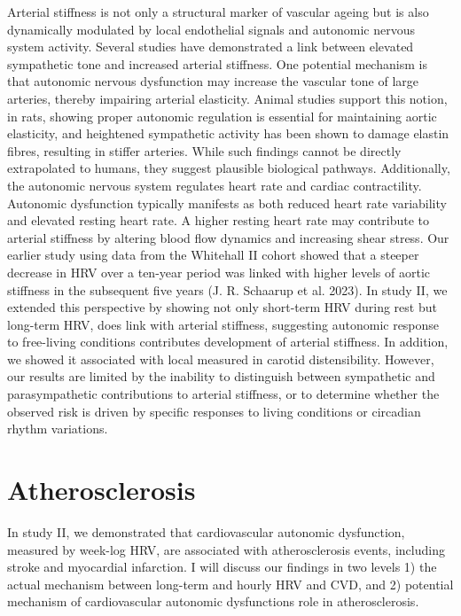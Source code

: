 \documentclass[
  a4paper,
  headsepline=true,
  open=any]{scrbook}
\begin{document}
Arterial stiffness is not only a structural marker of vascular ageing
but is also dynamically modulated by local endothelial signals and
autonomic nervous system activity. Several studies have demonstrated a
link between elevated sympathetic tone and increased arterial stiffness.
One potential mechanism is that autonomic nervous dysfunction may
increase the vascular tone of large arteries, thereby impairing arterial
elasticity. Animal studies support this notion, in rats, showing proper
autonomic regulation is essential for maintaining aortic elasticity, and
heightened sympathetic activity has been shown to damage elastin fibres,
resulting in stiffer arteries. While such findings cannot be directly
extrapolated to humans, they suggest plausible biological pathways.
Additionally, the autonomic nervous system regulates heart rate and
cardiac contractility. Autonomic dysfunction typically manifests as both
reduced heart rate variability and elevated resting heart rate. A higher
resting heart rate may contribute to arterial stiffness by altering
blood flow dynamics and increasing shear stress. Our earlier study using
data from the Whitehall II cohort showed that a steeper decrease in HRV
over a ten-year period was linked with higher levels of aortic stiffness
in the subsequent five years (J. R. Schaarup et al. 2023). In study II,
we extended this perspective by showing not only short-term HRV during
rest but long-term HRV, does link with arterial stiffness, suggesting
autonomic response to free-living conditions contributes development of
arterial stiffness. In addition, we showed it associated with local
measured in carotid distensibility. However, our results are limited by
the inability to distinguish between sympathetic and parasympathetic
contributions to arterial stiffness, or to determine whether the
observed risk is driven by specific responses to living conditions or
circadian rhythm variations.

\hypertarget{atherosclerosis-1}{%
\section{Atherosclerosis}\label{atherosclerosis-1}}

In study II, we demonstrated that cardiovascular autonomic dysfunction,
measured by week-log HRV, are associated with atherosclerosis events,
including stroke and myocardial infarction. I will discuss our findings
in two levels 1) the actual mechanism between long-term and hourly HRV
and CVD, and 2) potential mechanism of cardiovascular autonomic
dysfunctions role in atherosclerosis.
\end{document}
